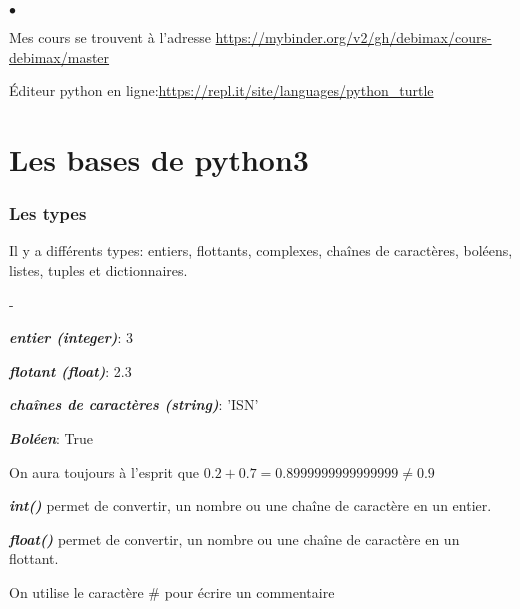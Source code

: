\documentclass[10pt,dvipsnames,  dvips]{article}
\begin{document}




\begin{list}{$\bullet$}{}
\item  Mes cours se trouvent à l'adresse \url{https://mybinder.org/v2/gh/debimax/cours-debimax/master}
\item Éditeur python en ligne:\url{https://repl.it/site/languages/python_turtle}
\end{list}

\section{Les bases de python3}

\subsubsection*{Les types}

Il y a  différents types:  entiers, flottants, complexes, chaînes de caractères, boléens, listes, tuples et dictionnaires.



\begin{list}{-}{}
\item \textbf{\textit{entier (integer)}}: 3
\item \textbf{\textit{flotant (float)}}: 2.3
\item \textbf{\textit{chaînes de caractères (string)}}: 'ISN'
\item \textbf{\textit{Boléen}}: True

\item  On aura toujours à l'esprit que $0.2+0.7=0.8999999999999999\neq 0.9$

 \item \textbf{\textit{int()}} permet de convertir, un nombre ou une chaîne de caractère en un entier.

 \item \textbf{\textit{float()}} permet de convertir, un nombre ou une chaîne de caractère en un flottant.
\item On utilise le caractère \# pour écrire un commentaire 
\end{list}
\end{document}
